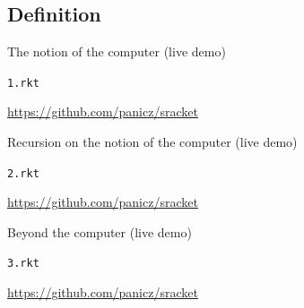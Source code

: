 \documentclass{beamer}
\begin{document}
\subsection{Definition}



\begin{frame}{The notion of the computer (live demo)}
  \begin{center}
    \Huge
    \texttt{1.rkt}
  \end{center}
  \url{https://github.com/panicz/sracket}
\end{frame}


\begin{frame}{Recursion on the notion of the computer (live demo)}
  \begin{center}
    \Huge
    \texttt{2.rkt}
  \end{center}
  \url{https://github.com/panicz/sracket}
\end{frame}


\begin{frame}{Beyond the computer (live demo)}
  \begin{center}
    \Huge
    \texttt{3.rkt}
  \end{center}
  \url{https://github.com/panicz/sracket}
\end{frame}


{ %
  \begin{frame}[plain]
  \end{frame}
}
\end{document}
